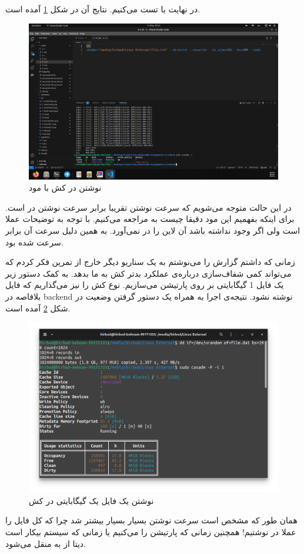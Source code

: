 در نهایت با
تست می‌کنیم.
نتایج آن در شکل
\ref{fig:3-4-wa}
آمده است.
\begin{figure}[H]
    \centering
    \includegraphics[scale=0.25]{pic/3-wa.png}
    \caption{نوشتن در کش با مود }
    \label{fig:3-4-wa}
\end{figure}
در این حالت متوجه می‌شویم که سرعت نوشتن تقریبا برابر سرعت نوشتن در
است. برای اینکه بفهمیم این مود دقیقا چیست به
مراجعه می‌کنیم. با توجه به توضیحات عملا
است ولی اگر
وجود نداشته باشد آن لاین را در
نمی‌آورد. به همین دلیل سرعت آن برابر سرعت
شده بود.

زمانی که داشتم گزارش را می‌نوشتم به یک سناریو دیگر خارج از تمرین فکر کردم که می‌تواند کمی شفاف‌سازی
درباره‌ی عملکرد بدتر کش به ما بدهد. به کمک دستور زیر یک فایل 1 گیگابایتی بر روی پارتیشن می‌سازیم.
نوع کش را نیز
می‌گذاریم که فایل بلافاصه در backend نوشته نشود.
نتیجه‌ی اجرا به همراه یک دستور گرفتن وضعیت
در شکل
\ref{fig:small_write}
آمده است.
\begin{figure}[H]
    \centering
    \includegraphics[scale=0.25]{pic/3-small-wb.png}
    \caption{نوشتن یک فایل یک گیگابایتی در کش}
    \label{fig:small_write}
\end{figure}
همان طور که مشخص است سرعت نوشتن بسیار بسیار بیشتر شد چرا که کل فایل را عملا در
نوشتیم! همچنین زمانی که پارتیشن را
می‌کنیم یا زمانی که سیستم بیکار است دیتا از
به
منقل می‌شود.


